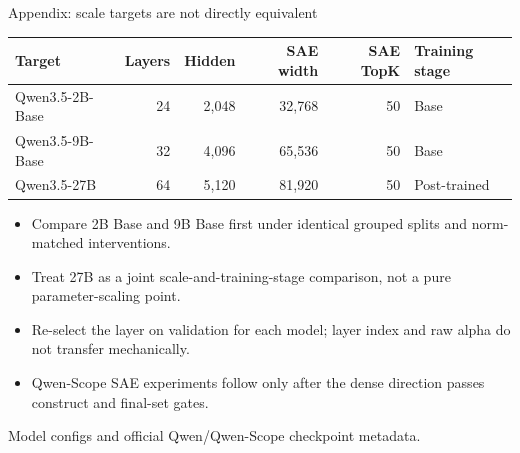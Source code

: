 \documentclass[aspectratio=169,10pt]{beamer}
\newenvironment{tightitemize}{%
  \begin{itemize}\setlength\itemsep{0.38em}\setlength\parskip{0pt}%
}{\end{itemize}}
\newcommand{\source}[1]{\vfill{\scriptsize\color{Gray}#1}}
\begin{document}
\begin{frame}{Appendix: scale targets are not directly equivalent}
\small
\begin{tabular}{@{}lrrrrl@{}}
\toprule
Target & Layers & Hidden & SAE width & SAE TopK & Training stage \\
\midrule
Qwen3.5-2B-Base & 24 & 2,048 & 32,768 & 50 & Base \\
Qwen3.5-9B-Base & 32 & 4,096 & 65,536 & 50 & Base \\
Qwen3.5-27B & 64 & 5,120 & 81,920 & 50 & Post-trained \\
\bottomrule
\end{tabular}

\vspace{0.42cm}
\begin{tightitemize}
  \item Compare 2B Base and 9B Base first under identical grouped splits and norm-matched interventions.
  \item Treat 27B as a joint scale-and-training-stage comparison, not a pure parameter-scaling point.
  \item Re-select the layer on validation for each model; layer index and raw alpha do not transfer mechanically.
  \item Qwen-Scope SAE experiments follow only after the dense direction passes construct and final-set gates.
\end{tightitemize}

\source{Model configs and official Qwen/Qwen-Scope checkpoint metadata.}
\end{frame}
\end{document}
